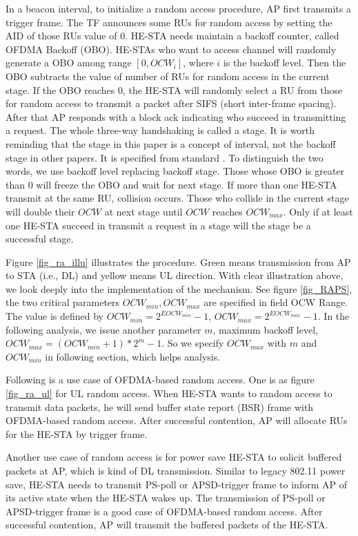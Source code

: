In a beacon interval, to initialize a random access procedure, AP first transmits a trigger frame. 
The TF announces some RUs for random access by setting the AID of those RUs value of 0. 
HE-STA needs maintain a backoff counter, called OFDMA Backoff (OBO). 
HE-STAs who want to access channel will randomly generate a OBO among range $[0, OCW_i]$, where $i$ is the backoff level. 
Then the OBO subtracts the value of number of RUs for random access in the current stage. 
If the OBO reaches 0, the HE-STA will randomly select a RU from those for random access to transmit a packet after SIFS (short inter-frame spacing). 
After that AP responds with a block ack indicating who succeed in transmitting a request. The whole three-way handshaking is called a stage. 
It is worth reminding that the stage in this paper is a concept of interval, not the backoff stage in other papers. 
It is specified from standard \cite{draft_ax}. To distinguish the two words, we use backoff level replacing backoff stage. 
Those whose OBO is greater than 0 will freeze the OBO and wait for next stage.  
If more than one HE-STA transmit at the same RU, collision occurs. 
Those who collide in the current stage will double their $OCW$ at next stage until $OCW$ reaches $OCW_{max}$. 
Only if at least one HE-STA succeed in transmit a request in a stage will the stage be a successful stage. 

Figure \ref{fig_ra_illu} illustrates the procedure. Green means transmission from AP to STA (i.e., DL) and yellow means UL direction. 
With clear illustration above, we look deeply into the implementation of the mechanism.
See figure \ref{fig_RAPS}, the two critical parameters $OCW_{min},OCW_{max}$ are specified in field OCW Range. 
The value is defined by $OCW_{min} = 2^{EOCW_{min}}-1$, $OCW_{max} = 2^{EOCW_{max}}-1$. 
In the following analysis, we issue another parameter $m$, maximum backoff level, $OCW_{max} = (OCW_{min}+1)*2^m-1$. So we specify $OCW_{max}$ with $m$ and $OCW_{min}$ in following section, which helps analysis.


Following is a use case of OFDMA-based random access. 
One is as figure \ref{fig_ra_ul} for UL random access. 
When HE-STA wants to random access to transmit data packets, he will send buffer state report (BSR) frame with OFDMA-based random access. 
After successful contention, AP will allocate RUs for the HE-STA by trigger frame. 


Another use case of random access is for power save HE-STA to solicit buffered packets at AP, which is kind of DL transmission.
Similar to legacy 802.11 power save, HE-STA needs to transmit PS-poll or APSD-trigger frame to inform AP of its active state when the HE-STA wakes up.
The transmission of PS-poll or APSD-trigger frame is a good case of OFDMA-based random access. After successful contention, AP will transmit the buffered packets of the HE-STA.

